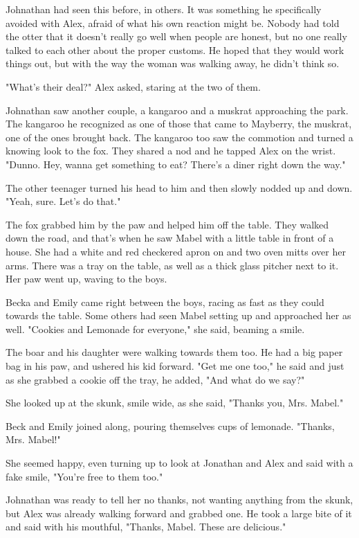 Johnathan had seen this before, in others. It was something he specifically avoided with Alex, afraid of what his own reaction might be. Nobody had told the otter that it doesn't really go well when people are honest, but no one really talked to each other about the proper customs. He hoped that they would work things out, but with the way the woman was walking away, he didn't think so.

"What's their deal?" Alex asked, staring at the two of them.

Johnathan saw another couple, a kangaroo and a muskrat approaching the park. The kangaroo he recognized as one of those that came to Mayberry, the muskrat, one of the ones brought back. The kangaroo too saw the commotion and turned a knowing look to the fox. They shared a nod and he tapped Alex on the wrist. "Dunno. Hey, wanna get something to eat? There's a diner right down the way."

The other teenager turned his head to him and then slowly nodded up and down. "Yeah, sure. Let's do that."

The fox grabbed him by the paw and helped him off the table. They walked down the road, and that's when he saw Mabel with a little table in front of a house. She had a white and red checkered apron on and two oven mitts over her arms. There was a tray on the table, as well as a thick glass pitcher next to it. Her paw went up, waving to the boys.

Becka and Emily came right between the boys, racing as fast as they could towards the table. Some others had seen Mabel setting up and approached her as well. "Cookies and Lemonade for everyone," she said, beaming a smile.

The boar and his daughter were walking towards them too. He had a big paper bag in his paw, and ushered his kid forward. "Get me one too," he said and just as she grabbed a cookie off the tray, he added, "And what do we say?"

She looked up at the skunk, smile wide, as she said, "Thanks you, Mrs. Mabel."

Beck and Emily joined along, pouring themselves cups of lemonade. "Thanks, Mrs. Mabel!"

She seemed happy, even turning up to look at Jonathan and Alex and said with a fake smile, "You're free to them too."

Johnathan was ready to tell her no thanks, not wanting anything from the skunk, but Alex was already walking forward and grabbed one. He took a large bite of it and said with his mouthful, "Thanks, Mabel. These are delicious."

